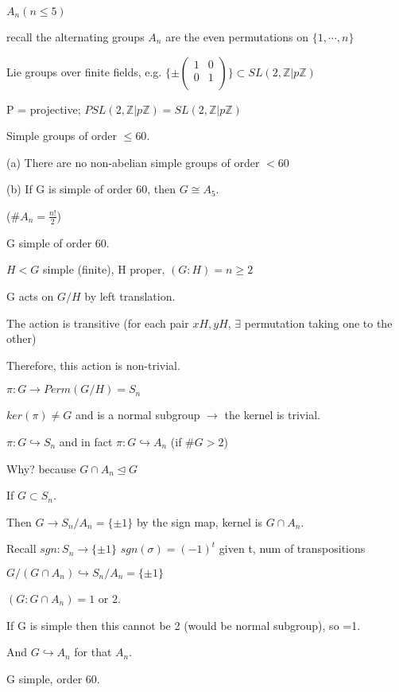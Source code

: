 \documentclass[12pt]{article}
\begin{document}
$A_n (n \leq 5)$

recall the alternating groups $A_n$ are the even permutations on $\{1, \cdots, n\}$

Lie groups over finite fields, e.g. $\{\pm \begin{pmatrix} 1 & 0 \\ 0 & 1 \\ \end{pmatrix}\} \subset SL(2, \mathds{Z}|p\mathds{Z})$

P = projective; $PSL(2, \mathds{Z}|p\mathds{Z}) = SL(2, \mathds{Z}|p\mathds{Z})$

\noindent
Simple groups of order $\leq 60$.

(a) There are no non-abelian simple groups of order $< 60$

(b) If G is simple of order 60, then $G \cong A_5$.

($\#A_n = \frac{n!}{2}$)

\noindent
G simple of order 60.

$H < G$ simple (finite), H proper, $(G: H) = n \geq 2$

G acts on $G\slash H$ by left translation.

The action is transitive (for each pair $xH, yH$, $\exists$ permutation taking one to the other)

Therefore, this action is non-trivial.

$\pi : G \to Perm(G\slash H) = S_n$

$ker(\pi) \neq G$ and is a normal subgroup $\to$ the kernel is trivial.

$\pi: G \hookrightarrow S_n$ and in fact $\pi: G \hookrightarrow A_n$ (if $\#G > 2$)

\noindent
Why? because $G \cap A_n \trianglelefteq G$

If $G \subset S_n$.

Then $G \to S_n/A_n = \{\pm 1\}$ by the sign map, kernel is $G \cap A_n$.

Recall $sgn: S_n \to \{\pm 1\}$ $sgn(\sigma) = (-1)^t$ given t, num of transpositions

$G/(G \cap A_n) \hookrightarrow S_n/A_n = \{\pm 1\}$

$(G : G \cap A_n) = 1$ or $2$.

If G is simple then this cannot be 2 (would be normal subgroup), so =1.

And $G \hookrightarrow A_n$ for that $A_n$.

\noindent
G simple, order 60.
\end{document}
